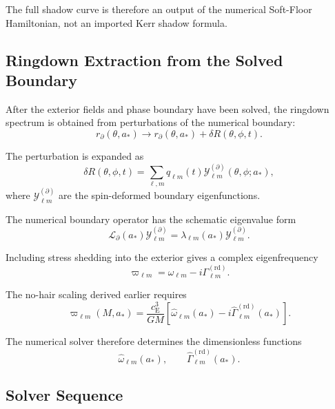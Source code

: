 The full shadow curve is therefore an output of the numerical Soft-Floor Hamiltonian, not an imported Kerr shadow formula.

\subsection{Ringdown Extraction from the Solved Boundary}

After the exterior fields and phase boundary have been solved, the ringdown spectrum is obtained from perturbations of the numerical boundary:
\begin{equation}
    r_{\partial}(\theta,a_\ast) \rightarrow r_{\partial}(\theta,a_\ast) + \delta R(\theta,\phi,t).
\end{equation}

The perturbation is expanded as
\begin{equation}
    \delta R(\theta,\phi,t) = \sum_{\ell,m} q_{\ell m}(t) \mathcal{Y}_{\ell m}^{(\partial)}(\theta,\phi;a_\ast),
\end{equation}
where $\mathcal{Y}_{\ell m}^{(\partial)}$ are the spin-deformed boundary eigenfunctions.

The numerical boundary operator has the schematic eigenvalue form
\begin{equation}
    \mathcal{L}_{\partial}(a_\ast)\mathcal{Y}_{\ell m}^{(\partial)} = \lambda_{\ell m}(a_\ast)\mathcal{Y}_{\ell m}^{(\partial)}.
\end{equation}

Including stress shedding into the exterior gives a complex eigenfrequency
\begin{equation}
    \varpi_{\ell m} = \omega_{\ell m} - i\Gamma_{\ell m}^{(\mathrm{rd})}.
\end{equation}

The no-hair scaling derived earlier requires
\begin{equation}
    \boxed{ \varpi_{\ell m}(M,a_\ast) = \frac{c_{\mathrm{E}}^3}{GM} \left[ \widehat{\omega}_{\ell m}(a_\ast) - i\widehat{\Gamma}_{\ell m}^{(\mathrm{rd})}(a_\ast) \right]. }
\end{equation}

The numerical solver therefore determines the dimensionless functions
\begin{equation}
    \widehat{\omega}_{\ell m}(a_\ast), \qquad \widehat{\Gamma}_{\ell m}^{(\mathrm{rd})}(a_\ast).
\end{equation}

\subsection{Solver Sequence}

